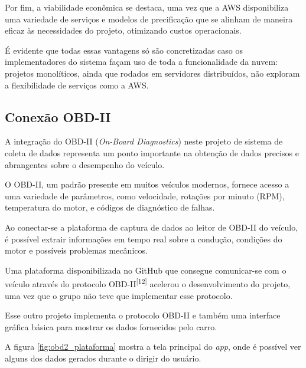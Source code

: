    Por fim, a viabilidade econômica se destaca, uma vez que a AWS disponibiliza uma variedade de serviços e modelos de precificação que se alinham de maneira eficaz às necessidades do projeto, otimizando custos operacionais.

    É evidente que todas essas vantagens só são concretizadas caso os implementadores do sistema façam uso de toda a funcionalidade da nuvem: projetos monolíticos, ainda que rodados em servidores distribuídos, não exploram a flexibilidade de serviços como a AWS. 

    \subsection{Conexão OBD-II}

    A integração do OBD-II (\textit{On-Board Diagnostics}) neste projeto de sistema de coleta de dados representa um ponto importante na obtenção de dados precisos e abrangentes sobre o desempenho do veículo. 
    
    O OBD-II, um padrão presente em muitos veículos modernos, fornece acesso a uma variedade de parâmetros, como velocidade, rotações por minuto (RPM), temperatura do motor, e códigos de diagnóstico de falhas. 
    
    Ao conectar-se a plataforma de captura de dados ao leitor de OBD-II do veículo, é possível extrair informações em tempo real sobre a condução, condições do motor e possíveis problemas mecânicos.

    Uma plataforma disponibilizada no GitHub que consegue comunicar-se com o veículo através do protocolo OBD-II\textsuperscript{[12]} acelerou o desenvolvimento do projeto, uma vez que o grupo não teve que implementar esse protocolo. 
    
    Esse outro projeto implementa o protocolo OBD-II e também uma interface gráfica básica para mostrar os dados fornecidos pelo carro.

    A figura \ref{fig:obd2_plataforma} mostra a tela principal do \textit{app}, onde é possível ver alguns dos dados gerados durante o dirigir do usuário.

